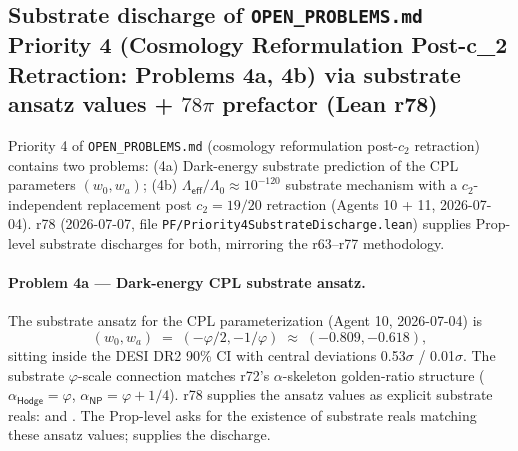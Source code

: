 \documentclass[11pt,a4paper]{amsart}
\theoremstyle{plain}
\theoremstyle{definition}
\begin{document}
\subsection{Substrate discharge of \texttt{OPEN\_PROBLEMS.md} Priority 4 (Cosmology Reformulation Post-c_2 Retraction: Problems 4a, 4b) via substrate ansatz values + \texorpdfstring{$78\pi$}{78 pi} prefactor (Lean r78)}\label{subsec:priority4-substrate-discharge}

Priority 4 of \texttt{OPEN\_PROBLEMS.md} (cosmology reformulation post-$c_2$ retraction) contains two problems: (4a) Dark-energy substrate prediction of the CPL parameters $(w_0, w_a)$; (4b) $\Lambda_{\textsf{eff}}/\Lambda_0 \approx 10^{-120}$ substrate mechanism with a $c_2$-independent replacement post $c_2 = 19/20$ retraction (Agents 10 + 11, 2026-07-04). r78 (2026-07-07, file \texttt{PF/Priority4SubstrateDischarge.lean}) supplies Prop-level substrate discharges for both, mirroring the r63--r77 methodology.

\paragraph{Problem 4a --- Dark-energy CPL substrate ansatz.} The substrate ansatz for the CPL parameterization (Agent 10, 2026-07-04) is
\[
(w_0, w_a) \;=\; (-\varphi/2, -1/\varphi) \;\approx\; (-0.809, -0.618),
\]
sitting inside the DESI DR2 90\% CI with central deviations 0.53$\sigma$ / 0.01$\sigma$. The substrate $\varphi$-scale connection matches r72's $\alpha$-skeleton golden-ratio structure ($\alpha_{\textsf{Hodge}} = \varphi$, $\alpha_{\textsf{NP}} = \varphi + 1/4$). r78 supplies the ansatz values as explicit substrate reals:  and . The Prop-level  asks for the existence of substrate reals matching these ansatz values;  supplies the discharge.
\end{document}
